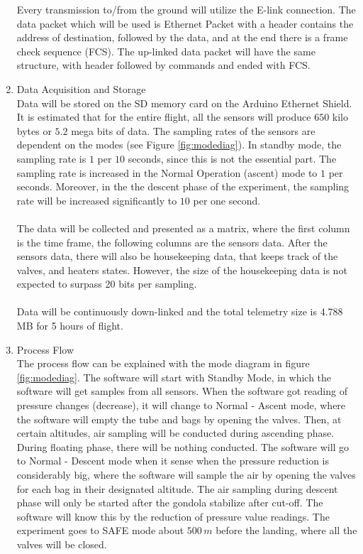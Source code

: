 \begin{enumerate}[label=(\alph*)]
Every transmission to/from the ground will utilize the E-link connection. The data packet which will be used is Ethernet Packet with a header contains the address of destination, followed by the data, and at the end there is a frame check sequence (FCS). The up-linked data packet will have the same structure, with header followed by commands and ended with FCS.
\item{Data Acquisition and Storage}\\
Data will be stored on the SD memory card on the Arduino Ethernet Shield. It is estimated that for the entire flight, all the sensors will produce $650$ kilo bytes or $5.2$ mega bits of data. The sampling rates of the sensors are dependent on the modes (see Figure \ref{fig:modediag}). In standby mode, the sampling rate is $1$ per $10$ seconds, since this is not the essential part. The sampling rate is increased in the Normal Operation (ascent) mode to $1$ per seconds. Moreover, in the the descent phase of the experiment, the sampling rate will be increased significantly to $10$ per one second.\\
\\
The data will be collected and presented as a matrix, where the first column is the time frame, the following columns are the sensors data. After the sensors data, there will also be housekeeping data, that keeps track of the valves, and heaters states. However, the size of the housekeeping data is not expected to surpass 20 bits per sampling.\\
\\
Data will be continuously down-linked and the total telemetry size is 4.788 MB for 5 hours of flight.
\item{Process Flow}\\
The process flow can be explained with the mode diagram in figure \ref{fig:modediag}. The software will start with Standby Mode, in which the software will get samples from all sensors. When the software got reading of pressure changes (decrease), it will change to Normal - Ascent mode, where the software will empty the tube and bags by opening the valves. Then, at certain altitudes, air sampling will be conducted during ascending phase. During floating phase, there will be nothing conducted. The software will go to Normal - Descent mode when it sense when the pressure reduction is considerably big, where the software will sample the air by opening the valves for each bag in their designated altitude. The air sampling during descent phase will only be started after the gondola stabilize after cut-off. The software will know this by the reduction of pressure value readings. The experiment goes to SAFE mode about $500 \, m$ before the landing, where all the valves will be closed. 

\end{enumerate}
